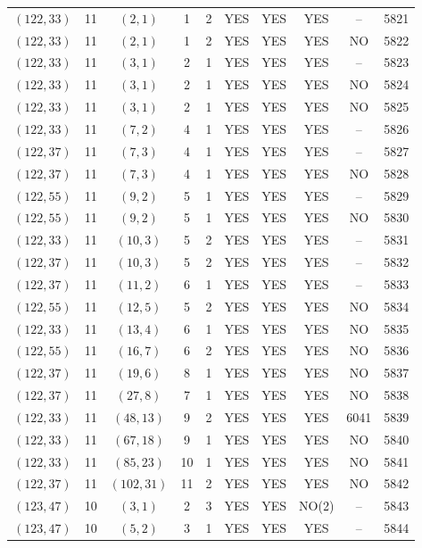 \begin{longtable}{|c|c|c|c|c|c|c|c|c|c|}
$(122, 33)$ & 11 & $(2, 1)$ & 1 & 2 & YES & YES & YES & -- & 5821\\
$(122, 33)$ & 11 & $(2, 1)$ & 1 & 2 & YES & YES & YES & NO & 5822\\
$(122, 33)$ & 11 & $(3, 1)$ & 2 & 1 & YES & YES & YES & -- & 5823\\
$(122, 33)$ & 11 & $(3, 1)$ & 2 & 1 & YES & YES & YES & NO & 5824\\
$(122, 33)$ & 11 & $(3, 1)$ & 2 & 1 & YES & YES & YES & NO & 5825\\
$(122, 33)$ & 11 & $(7, 2)$ & 4 & 1 & YES & YES & YES & -- & 5826\\
$(122, 37)$ & 11 & $(7, 3)$ & 4 & 1 & YES & YES & YES & -- & 5827\\
$(122, 37)$ & 11 & $(7, 3)$ & 4 & 1 & YES & YES & YES & NO & 5828\\
$(122, 55)$ & 11 & $(9, 2)$ & 5 & 1 & YES & YES & YES & -- & 5829\\
$(122, 55)$ & 11 & $(9, 2)$ & 5 & 1 & YES & YES & YES & NO & 5830\\
$(122, 33)$ & 11 & $(10, 3)$ & 5 & 2 & YES & YES & YES & -- & 5831\\
$(122, 37)$ & 11 & $(10, 3)$ & 5 & 2 & YES & YES & YES & -- & 5832\\
$(122, 37)$ & 11 & $(11, 2)$ & 6 & 1 & YES & YES & YES & -- & 5833\\
$(122, 55)$ & 11 & $(12, 5)$ & 5 & 2 & YES & YES & YES & NO & 5834\\
$(122, 33)$ & 11 & $(13, 4)$ & 6 & 1 & YES & YES & YES & NO & 5835\\
$(122, 55)$ & 11 & $(16, 7)$ & 6 & 2 & YES & YES & YES & NO & 5836\\
$(122, 37)$ & 11 & $(19, 6)$ & 8 & 1 & YES & YES & YES & NO & 5837\\
$(122, 37)$ & 11 & $(27, 8)$ & 7 & 1 & YES & YES & YES & NO & 5838\\
$(122, 33)$ & 11 & $(48, 13)$ & 9 & 2 & YES & YES & YES & 6041 & 5839\\
$(122, 33)$ & 11 & $(67, 18)$ & 9 & 1 & YES & YES & YES & NO & 5840\\
$(122, 33)$ & 11 & $(85, 23)$ & 10 & 1 & YES & YES & YES & NO & 5841\\
$(122, 37)$ & 11 & $(102, 31)$ & 11 & 2 & YES & YES & YES & NO & 5842\\
$(123, 47)$ & 10 & $(3, 1)$ & 2 & 3 & YES & YES & NO(2) & -- & 5843\\
$(123, 47)$ & 10 & $(5, 2)$ & 3 & 1 & YES & YES & YES & -- & 5844\\

\end{longtable}
